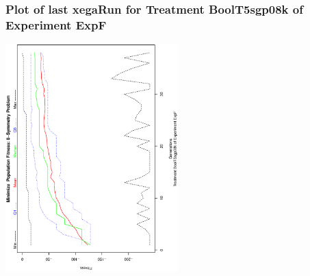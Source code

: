  \begin{frame}
 \frametitle{ Plot of last xegaRun for Treatment BoolT5sgp08k of Experiment ExpF }
 \begin{center}
\includegraphics[width=0.5\textwidth, angle=-90]
{ExpFPlotPopStatsFigure006.eps}
 \end{center}
 \label{report/ExpFPlotPopStatsFigure006.eps}  
 \end{frame}

